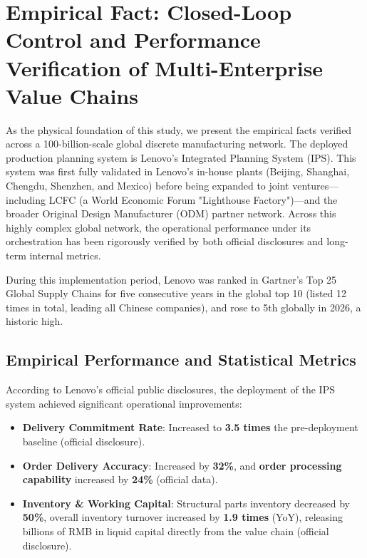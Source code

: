 \documentclass[11pt,a4paper]{article}
\begin{document}
\section{Empirical Fact: Closed-Loop Control and Performance Verification of Multi-Enterprise Value Chains}
As the physical foundation of this study, we present the empirical facts verified across a 100-billion-scale global discrete manufacturing network. The deployed production planning system is Lenovo's Integrated Planning System (IPS). This system was first fully validated in Lenovo's in-house plants (Beijing, Shanghai, Chengdu, Shenzhen, and Mexico) before being expanded to joint ventures—including LCFC (a World Economic Forum "Lighthouse Factory")—and the broader Original Design Manufacturer (ODM) partner network. Across this highly complex global network, the operational performance under its orchestration has been rigorously verified by both official disclosures and long-term internal metrics.

During this implementation period, Lenovo was ranked in Gartner's Top 25 Global Supply Chains for five consecutive years in the global top 10 (listed 12 times in total, leading all Chinese companies), and rose to 5th globally in 2026, a historic high.

\subsection{Empirical Performance and Statistical Metrics}
According to Lenovo's official public disclosures, the deployment of the IPS system achieved significant operational improvements:
\begin{itemize}
    \item \textbf{Delivery Commitment Rate}: Increased to \textbf{3.5 times} the pre-deployment baseline (official disclosure).
    \item \textbf{Order Delivery Accuracy}: Increased by \textbf{32\%}, and \textbf{order processing capability} increased by \textbf{24\%} (official data).
    \item \textbf{Inventory \& Working Capital}: Structural parts inventory decreased by \textbf{50\%}, overall inventory turnover increased by \textbf{1.9 times} (YoY), releasing billions of RMB in liquid capital directly from the value chain (official disclosure).
\end{itemize}
\end{document}
